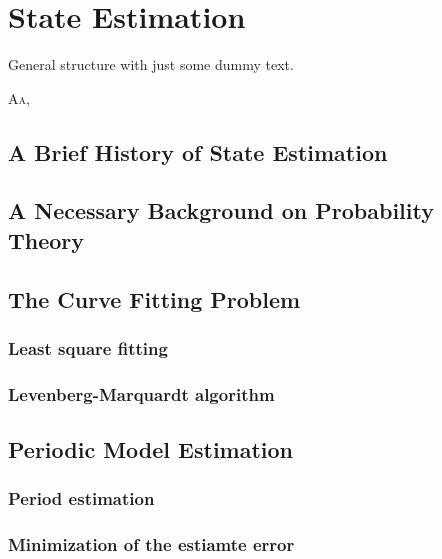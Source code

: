 
\chapter{State Estimation}
\label{cp:est}

\begin{highlight}
    \begin{st}
        General structure with just some dummy text.
    \end{st} 
\end{highlight}

\lettrine{A}{a}, 


\section{A Brief History of State Estimation}


\section{A Necessary Background on Probability Theory}


\section{The Curve Fitting Problem}

\subsection{Least square fitting}

\subsection{Levenberg-Marquardt algorithm}


\section{Periodic Model Estimation}

\subsection{Period estimation}

\subsection{Minimization of the estiamte error}

